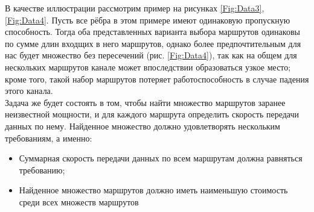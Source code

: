 \documentclass[a4paper]{article}
\begin{document}
В качестве иллюстрации рассмотрим пример на рисунках \ref{Fig:Data3}, \ref{Fig:Data4}. Пусть все рёбра в этом примере имеют одинаковую пропускную способность. Тогда оба представленных варианта выбора маршрутов одинаковы по сумме длин входщих в него маршрутов, однако более предпочтительным для нас будет множество без пересечений (рис. \ref{Fig:Data4}), так как на общем для нескольких маршрутов канале может впоследствии образоваться узкое место; кроме того, такой набор маршрутов потеряет работоспособность в случае падения этого канала.\\
Задача же будет состоять в том, чтобы найти множество маршрутов заранее неизвестной мощности, и для каждого маршрута определить скорость передачи данных по нему. 
Найденное множество должно удовлетворять нескольким требованиям, а именно: \\
\begin{itemize}
\item Суммарная скорость передачи данных по всем маршрутам должна равняться требованию;
\item Найденное множество маршрутов должно иметь наименьшую стоимость среди всех множеств маршрутов
\end{itemize}

\newpage
\end{document}
